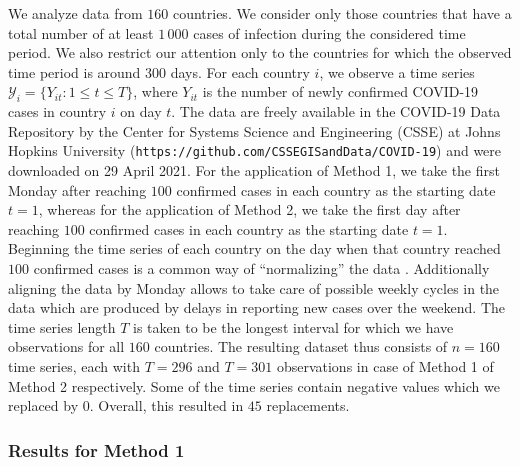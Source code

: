 \documentclass[a4paper,12pt]{article}
\numberwithin{equation}{section}
\begin{document}
We analyze data from $160$ countries. We consider only those countries that have a total number of at least $1\,000$ cases of infection during the considered time period. We also restrict our attention only to the countries for which the observed time period is around $300$ days. For each country $i$, we observe a time series $\mathcal{Y}_i = \{ Y_{it}: 1 \le t \le T \}$, where $Y_{it}$ is the number of newly confirmed COVID-19 cases in country $i$ on day $t$. The data are freely available in the COVID-19 Data Repository by the Center for Systems Science and Engineering (CSSE) at Johns Hopkins University (\texttt{https://github.com/CSSEGISandData/COVID-19}) and were downloaded on 29 April 2021. For the application of Method 1, we take the first Monday after reaching $100$ confirmed cases in each country as the starting date $t=1$, whereas for the application of Method 2, we take the first day after reaching $100$ confirmed cases in each country as the starting date $t=1$.
Beginning the time series of each country on the day when that country reached $100$ confirmed cases is a common way of ``normalizing'' the data \citep[see e.g.][]{Cohen2020}. Additionally aligning the data by Monday allows to take care of possible weekly cycles in the data which are produced by delays in reporting new cases over the weekend. 
The time series length $T$ is taken to be the longest interval for which we have observations for all $160$ countries. The resulting dataset thus consists of $n = 160$ time series, each with $T = 296$ and $T = 301$ observations in case of Method 1 of Method 2 respectively. Some of the time series contain negative values which we replaced by $0$. Overall, this resulted in $45$ replacements.


\subsubsection{Results for Method 1}\label{subsubsec:method1}
\end{document}
